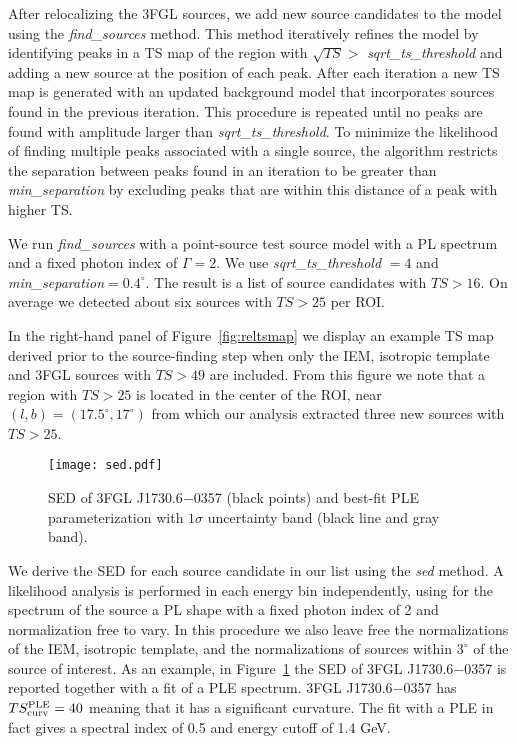 \documentclass[iop]{emulateapj}
\begin{document}
After relocalizing the 3FGL sources, we add new source candidates to
the model using the {\it find\_sources} method.  This method
iteratively refines the model by identifying peaks in a TS map of the
region with $\sqrt{TS} > $ {\it sqrt\_ts\_threshold} and adding a new
source at the position of each peak.  After each iteration a new TS
map is generated with an updated background model that incorporates
sources found in the previous iteration.  This procedure is repeated
until no peaks are found with amplitude larger than {\it
  sqrt\_ts\_threshold}.  To minimize the likelihood of finding
multiple peaks associated with a single source, the algorithm restricts
the separation between peaks found in an iteration to be greater than
{\it min\_separation} by excluding peaks that are within this distance
of a peak with higher TS.

We run {\it find\_sources} with a point-source test source model with
a PL spectrum and a fixed photon index of $\Gamma = 2$.  We use
{\it sqrt\_ts\_threshold} $=4$ and {\it
  min\_separation}$=0.4^{\circ}$.  The result is a list of source
candidates with $TS>16$.  On average we detected about six sources
with $TS>25$ per ROI.

In the right-hand panel of Figure~\ref{fig:reltsmap} we display an example TS map
derived prior to the source-finding step when only the IEM, isotropic
template and 3FGL sources with $TS>49$ are included.  From this figure
we note that a region with $TS>25$ is located in the center of
the ROI, near $(l,b)=(17.5^{\circ},17^{\circ})$ from which our
analysis extracted three new sources with $TS>25$.

\begin{figure}
	\centering
\texttt{[image: sed.pdf]}
\caption{SED of 3FGL J1730.6$-$0357 (black points) and best-fit PLE
  parameterization with $1\sigma$ uncertainty band (black line and
  gray band).}
\label{fig:sed} 
\end{figure}

We derive the SED for each source candidate in our list using the {\it
  sed} method. A likelihood analysis is performed in each
energy bin independently, using for the spectrum of the source a PL shape with a fixed
photon index of 2 and normalization free to vary. In this procedure we also
leave free the normalizations of the IEM, isotropic template, and the
normalizations of sources within $3^{\circ}$ of the source of
interest.  As an example, in Figure~\ref{fig:sed} the SED of 3FGL
J1730.6$-$0357 is reported together with a fit of a PLE
spectrum. 3FGL J1730.6$-$0357 has $TS^{\rm{PLE}}_{\rm{curv}}=40$
meaning that it has a significant curvature. The fit with a PLE in
fact gives a spectral index of 0.5 and energy cutoff of 1.4 GeV.
\end{document}
